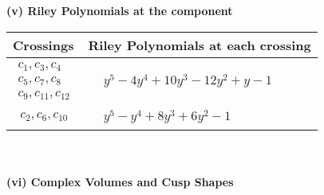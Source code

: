\documentclass[1p]{elsarticle_modified}
\theoremstyle{definition}
\begin{document}
\newpage\renewcommand{\arraystretch}{1}
\flushleft \textbf{(v) Riley Polynomials at the component}\newline \\
\begin{tabular}{m{50pt}|m{274pt}}
Crossings & \hspace{64pt}Riley Polynomials at each crossing \\
\hline $$\begin{aligned}c_{1},c_{3},c_{4}\\c_{5},c_{7},c_{8}\\c_{9},c_{11},c_{12}\end{aligned}$$&$\begin{aligned}
&y^5-4 y^4+10 y^3-12 y^2+y-1
\end{aligned}$\\
\hline $$\begin{aligned}c_{2},c_{6},c_{10}\end{aligned}$$&$\begin{aligned}
&y^5- y^4+8 y^3+6 y^2-1
\end{aligned}$\\
\hline
\end{tabular}\\~\\
\newpage\flushleft \textbf{(vi) Complex Volumes and Cusp Shapes}
\end{document}
